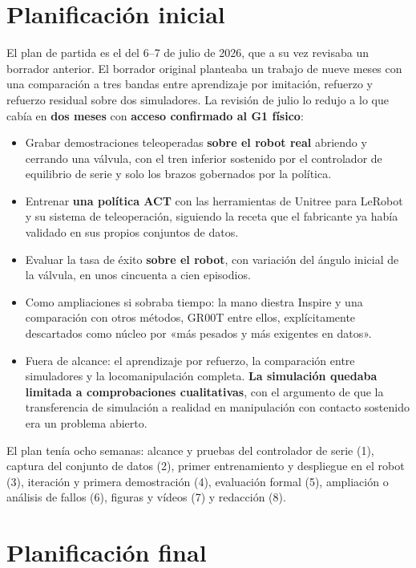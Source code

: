 \section{Planificación inicial}

El plan de partida es el del 6--7 de julio de 2026, que a su vez revisaba un borrador anterior. El
borrador original planteaba un trabajo de nueve meses con una comparación a tres bandas entre
aprendizaje por imitación, refuerzo y refuerzo residual sobre dos simuladores. La revisión de julio
lo redujo a lo que cabía en \textbf{dos meses} con \textbf{acceso confirmado al G1 físico}:

\begin{itemize}
	\item Grabar demostraciones teleoperadas \textbf{sobre el robot real} abriendo y cerrando una
	válvula, con el tren inferior sostenido por el controlador de equilibrio de serie y solo los
	brazos gobernados por la política.
	\item Entrenar \textbf{una política ACT} con las herramientas de Unitree para LeRobot y su
	sistema de teleoperación, siguiendo la receta que el fabricante ya había validado en sus
	propios conjuntos de datos.
	\item Evaluar la tasa de éxito \textbf{sobre el robot}, con variación del ángulo inicial de la
	válvula, en unos cincuenta a cien episodios.
	\item Como ampliaciones si sobraba tiempo: la mano diestra Inspire y una comparación con otros
	métodos, GR00T entre ellos, explícitamente descartados como núcleo por «más pesados y más
	exigentes en datos».
	\item Fuera de alcance: el aprendizaje por refuerzo, la comparación entre simuladores y la
	locomanipulación completa. \textbf{La simulación quedaba limitada a comprobaciones cualitativas},
	con el argumento de que la transferencia de simulación a realidad en manipulación con
	contacto sostenido era un problema abierto.
\end{itemize}

El plan tenía ocho semanas: alcance y pruebas del controlador de serie (1), captura del conjunto de
datos (2), primer entrenamiento y despliegue en el robot (3), iteración y primera demostración (4),
evaluación formal (5), ampliación o análisis de fallos (6), figuras y vídeos (7) y redacción (8).

\section{Planificación final}

